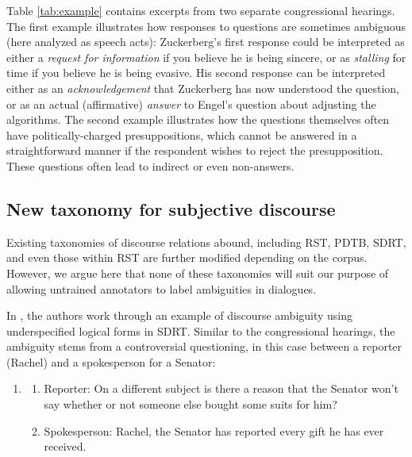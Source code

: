 Table \ref{tab:example} contains excerpts from two separate congressional hearings. The first example illustrates how responses to questions are sometimes ambiguous (here analyzed as speech acts): Zuckerberg's first response could be interpreted as either a \emph{request for information} if you believe he is being sincere, or as \emph{stalling} for time if you believe he is being evasive. His second response can be interpreted either as an \emph{acknowledgement} that Zuckerberg has now understood the question, or as an actual (affirmative) \emph{answer} to Engel's question about adjusting the algorithms. The second example illustrates how the questions themselves often have politically-charged presuppositions, which cannot be answered in a straightforward manner if the respondent wishes to reject the presupposition. These questions often lead to indirect or even non-answers.

\subsection{New taxonomy for subjective discourse}
Existing taxonomies of discourse relations abound, including RST, PDTB, SDRT, and even those within RST are further modified depending on the corpus. However, we argue here that none of these taxonomies will suit our purpose of allowing untrained annotators to label ambiguities in dialogues.

In \cite{Asher:2018}, the authors work through an example of discourse ambiguity using underspecified logical forms in SDRT. Similar to the congressional hearings, the ambiguity stems from a controversial questioning, in this case between a reporter (Rachel) and a spokesperson for a Senator:

\begin{enumerate}
\item \label{ex:1}
\begin{enumerate}
\setlength\itemsep{0em}
 \item Reporter: On a different subject is there a reason that the Senator won’t say whether or not someone else bought some suits for him? \label{ex:1a}
\item Spokesperson: Rachel, the Senator has reported every gift he has ever received. \label{ex:1b}
\end{enumerate}
\end{enumerate}

